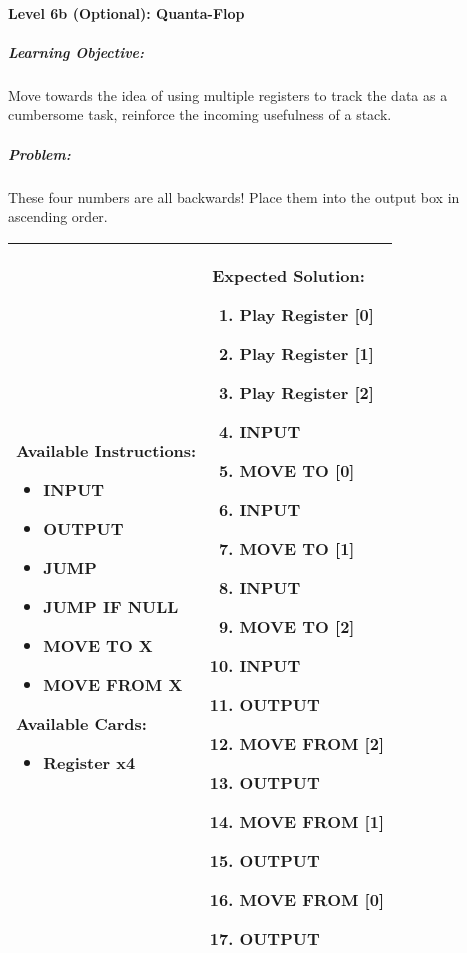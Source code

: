 \paragraph{Level 6b (Optional): Quanta-Flop}
\subparagraph{Learning Objective:} Move towards the idea of using multiple registers to track the data as a cumbersome task, reinforce the incoming usefulness of a stack.

\subparagraph{Problem:} These four numbers are all backwards! Place them into the output box in ascending order.

\begin{center}
    \begin{tabular}{ | m{5cm} | m{9cm} | } 
        \hline
            \textbf{Available Instructions:} 
            \begin{itemize}
                \setlength\itemsep{-.35em}
                \item INPUT
                \item OUTPUT
                \item JUMP
                \item JUMP IF NULL
                \item MOVE TO X
                \item MOVE FROM X
            \end{itemize}
            \textbf{Available Cards:} 
            \begin{itemize}
                \setlength\itemsep{-.35em}
                \item Register x4
            \end{itemize}& 
            \textbf{Expected Solution:} 
            \begin{enumerate}
                \setlength\itemsep{-.35em}
                \item Play Register [0]
                \item Play Register [1]
		\item Play Register [2]
                \item INPUT
                \item MOVE TO [0]
                \item INPUT
                \item MOVE TO [1]
                \item INPUT
		\item MOVE TO [2]
		\item INPUT
                \item OUTPUT
		\item MOVE FROM [2]
		\item OUTPUT
                \item MOVE FROM [1] 
                \item OUTPUT
                \item MOVE FROM [0] 
                \item OUTPUT
            \end{enumerate}
            \\
        \hline
    \end{tabular}
\end{center}


